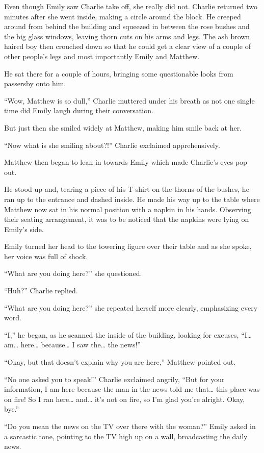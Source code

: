Even though Emily saw Charlie take off, she really did not. Charlie returned two minutes after she went inside, making a circle around the block. He creeped around from behind the building and squeezed in between the rose bushes and the big glass windows, leaving thorn cuts on his arms and legs. The ash brown haired boy then crouched down so that he could get a clear view of a couple of other people’s legs and most importantly Emily and Matthew.

He sat there for a couple of hours, bringing some questionable looks from passersby onto him.

“Wow, Matthew is so dull,” Charlie muttered under his breath as not one single time did Emily laugh during their conversation.

But just then she smiled widely at Matthew, making him smile back at her.

“Now what is she smiling about?!” Charlie exclaimed apprehensively.

Matthew then began to lean in towards Emily which made Charlie’s eyes pop out.

He stood up and, tearing a piece of his T-shirt on the thorns of the bushes, he ran up to the entrance and dashed inside. He made his way up to the table where Matthew now sat in his normal position with a napkin in his hands. Observing their seating arrangement, it was to be noticed that the napkins were lying on Emily’s side.

Emily turned her head to the towering figure over their table and as she spoke, her voice was full of shock.

“What are you doing here?” she questioned.

“Huh?” Charlie replied.

“What are you doing here?” she repeated herself more clearly, emphasizing every word.

“I,” he began, as he scanned the inside of the building, looking for excuses, “I… am… here… because… I saw the… the news!”

“Okay, but that doesn’t explain why you are here,” Matthew pointed out.

“No one asked you to speak!” Charlie exclaimed angrily, “But for your information, I am here because the man in the news told me that… this place was on fire! So I ran here… and… it’s not on fire, so I’m glad you’re alright. Okay, bye.”

“Do you mean the news on the TV over there with the woman?” Emily asked in a sarcastic tone, pointing to the TV high up on a wall, broadcasting the daily news.

